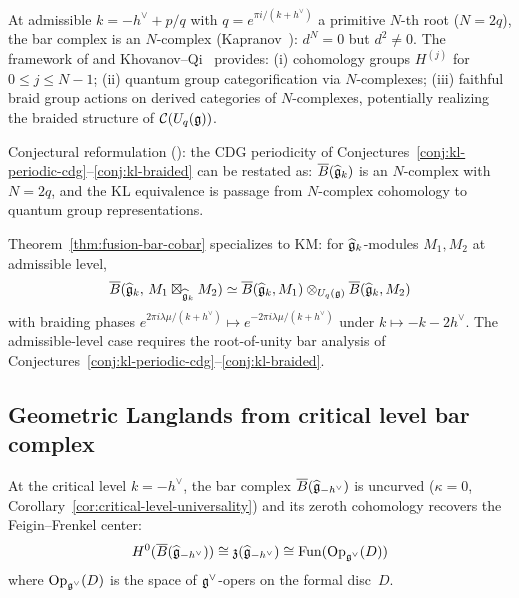 \begin{remark}\label{rem:n-complex-framework}
At admissible $k = -h^\vee + p/q$ with $q = e^{\pi i/(k+h^\vee)}$ a primitive $N$-th root ($N = 2q$), the bar complex is an $N$-complex (Kapranov~\cite{Kapranov96}): $d^N = 0$ but $d^2 \neq 0$.  The framework of \cite{Kapranov96} and Khovanov--Qi~\cite{KQ20} provides: (i) cohomology groups $H^{(j)}$ for $0 \leq j \leq N-1$; (ii) quantum group categorification via $N$-complexes; (iii) faithful braid group actions on derived categories of $N$-complexes, potentially realizing the braided structure of $\mathcal{C}(U_q(\mathfrak{g}))$.

Conjectural reformulation (\ClaimStatusConjectured): the CDG periodicity of Conjectures~\ref{conj:kl-periodic-cdg}--\ref{conj:kl-braided} can be restated as: $\overline{B}(\widehat{\mathfrak{g}}_k)$ is an $N$-complex with $N = 2q$, and the KL equivalence is passage from $N$-complex cohomology to quantum group representations.
\end{remark}

\begin{remark}
\label{rem:km-fusion-bar-cobar}
Theorem~\ref{thm:fusion-bar-cobar} specializes to KM: for $\widehat{\mathfrak{g}}_k$-modules $M_1, M_2$ at admissible level,
\begin{equation}\label{eq:fusion-bar-cobar}
\overline{B}(\widehat{\mathfrak{g}}_k,\, M_1 \boxtimes_{\widehat{\mathfrak{g}}_k} M_2)
\simeq
\overline{B}(\widehat{\mathfrak{g}}_k, M_1) \otimes_{U_q(\mathfrak{g})}
\overline{B}(\widehat{\mathfrak{g}}_k, M_2)
\end{equation}
with braiding phases $e^{2\pi i \lambda\mu/(k+h^\vee)} \mapsto e^{-2\pi i \lambda\mu/(k+h^\vee)}$ under $k \mapsto -k - 2h^\vee$.  The admissible-level case requires the root-of-unity bar analysis of Conjectures~\ref{conj:kl-periodic-cdg}--\ref{conj:kl-braided}.
\end{remark}

\subsection{Geometric Langlands from critical level bar complex}
\label{subsec:geom-langlands-bar}

\begin{theorem}\label{thm:oper-bar-h0}
At the critical level $k = -h^\vee$, the bar complex
$\overline{B}(\widehat{\mathfrak{g}}_{-h^\vee})$ is uncurved ($\kappa = 0$,
Corollary~\ref{cor:critical-level-universality}) and its
zeroth cohomology recovers the Feigin--Frenkel center:
\begin{equation}\label{eq:bar-oper}
H^0(\overline{B}(\widehat{\mathfrak{g}}_{-h^\vee}))
\cong \mathfrak{z}(\widehat{\mathfrak{g}}_{-h^\vee})
\cong \mathrm{Fun}(\mathrm{Op}_{\mathfrak{g}^\vee}(D))
\end{equation}
where $\mathrm{Op}_{\mathfrak{g}^\vee}(D)$ is the space of $\mathfrak{g}^\vee$-opers
on the formal disc~$D$.
\end{theorem}

